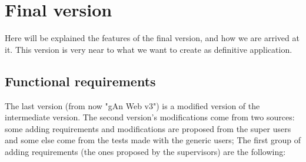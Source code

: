 
\chapter{Final version} %

\label{Chapter5} %

Here will be explained the features of the final version, and how we are arrived at it. This version is very near to what we want to create as definitive application.

\section{Functional requirements}

The last version (from now "gAn Web v3") is a modified version of the intermediate version. 
The second version's modifications come from two sources: some adding requirements and modifications are proposed from the super users and some else come from the tests made with the generic users; 
The first group of adding requirements (the ones proposed by the supervisors) are the following:

